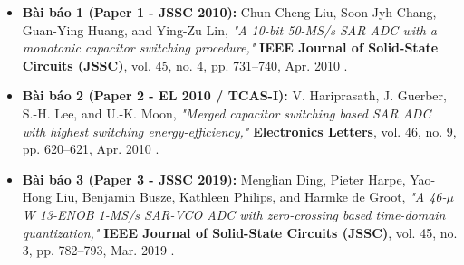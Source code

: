 \documentclass[12pt,a4paper]{article}
\begin{document}
\begin{itemize}
    \item \textbf{Bài báo 1 (Paper 1 - JSSC 2010):} Chun-Cheng Liu, Soon-Jyh Chang, Guan-Ying Huang, and Ying-Zu Lin, \textit{"A 10-bit 50-MS/s SAR ADC with a monotonic capacitor switching procedure,"} \textbf{IEEE Journal of Solid-State Circuits (JSSC)}, vol. 45, no. 4, pp. 731--740, Apr. 2010 \cite{liu2010}.
    \item \textbf{Bài báo 2 (Paper 2 - EL 2010 / TCAS-I):} V. Hariprasath, J. Guerber, S.-H. Lee, and U.-K. Moon, \textit{"Merged capacitor switching based SAR ADC with highest switching energy-efficiency,"} \textbf{Electronics Letters}, vol. 46, no. 9, pp. 620--621, Apr. 2010 \cite{hariprasath2010}.
    \item \textbf{Bài báo 3 (Paper 3 - JSSC 2019):} Menglian Ding, Pieter Harpe, Yao-Hong Liu, Benjamin Busze, Kathleen Philips, and Harmke de Groot, \textit{"A 46-$\mu$W 13-ENOB 1-MS/s SAR-VCO ADC with zero-crossing based time-domain quantization,"} \textbf{IEEE Journal of Solid-State Circuits (JSSC)}, vol. 45, no. 3, pp. 782--793, Mar. 2019 \cite{ding2019}.
\end{itemize}
\end{document}

